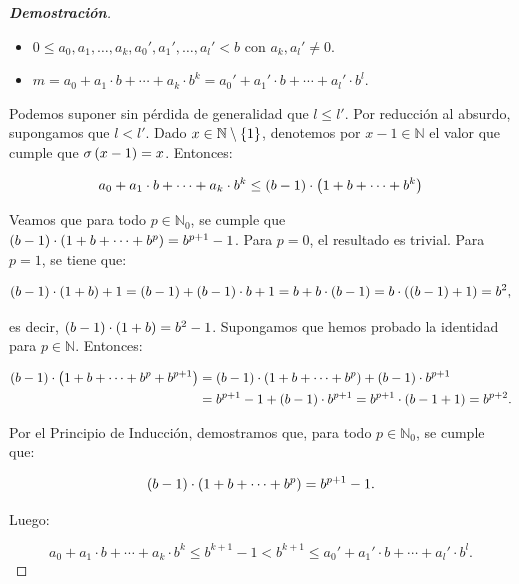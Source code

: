 \begin{theorem}
\begin{proof}[\rm\textbf{Demostración}]
  \begin{itemize}
    \item[1.] $0\leq a_0,a_1,\dots,a_k,a_0',a_1',\dots,a_l'<b$ con $a_k,a_l'\neq 0$.
    \item[2.] $m=a_0+a_1\cdot b+\cdots+a_k\cdot b^k=a_0'+a_1'\cdot b+\cdots+a_l'\cdot b^l$.
  \end{itemize}

  Podemos suponer sin pérdida de generalidad que $l\leq l'$. Por reducción al absurdo, supongamos que $l<l'$. Dado $x\in\mathbb{N}\setminus\left\{1\right\}$, denotemos por $x-1\in\mathbb{N}$ el valor que cumple que $\sigma\left(x-1\right)=x$. Entonces:

  \begin{equation}
      a_0+a_1\cdot b+\cdots+a_k\cdot b^k\leq\left(b-1\right)\cdot\left(1+b+\cdots+b^k\right)
  \end{equation}

  Veamos que para todo $p\in\mathbb{N}_0$, se cumple que $\left(b-1\right)\cdot\left(1+b+\cdots+b^p\right)=b^{p+1}-1$. Para $p=0$, el resultado es trivial. Para $p=1$, se tiene que:

  \begin{equation}
    \left(b-1\right)\cdot\left(1+b\right)+1=\left(b-1\right)+\left(b-1\right)\cdot b+1=b+b\cdot\left(b-1\right)=b\cdot\left(\left(b-1\right)+1\right)=b^2,
  \end{equation}

  es decir, $\left(b-1\right)\cdot\left(1+b\right)=b^2-1$. Supongamos que hemos probado la identidad para $p\in\mathbb{N}$. Entonces:

  \begin{equation}
    \begin{split}
      \left(b-1\right)\cdot\left(1+b+\cdots+b^p+b^{p+1}\right) & =\left(b-1\right)\cdot\left(1+b+\cdots+b^p\right)+\left(b-1\right)\cdot b^{p+1}\\
      & =b^{p+1}-1+\left(b-1\right)\cdot b^{p+1}=b^{p+1}\cdot\left(b-1+1\right)=b^{p+2}.
    \end{split}
  \end{equation}

  Por el Principio de Inducción, demostramos que, para todo $p\in\mathbb{N}_0$, se cumple que:
  
  \begin{equation}
    \left(b-1\right)\cdot\left(1+b+\cdots+b^p\right)=b^{p+1}-1.
  \end{equation}

  Luego:

  \begin{equation}
    a_0+a_1\cdot b+\cdots+a_k\cdot b^k\leq b^{k+1}-1<b^{k+1}\leq a_0'+a_1'\cdot b+\cdots+a_l'\cdot b^l.
  \end{equation}


\end{proof}
\end{theorem}
